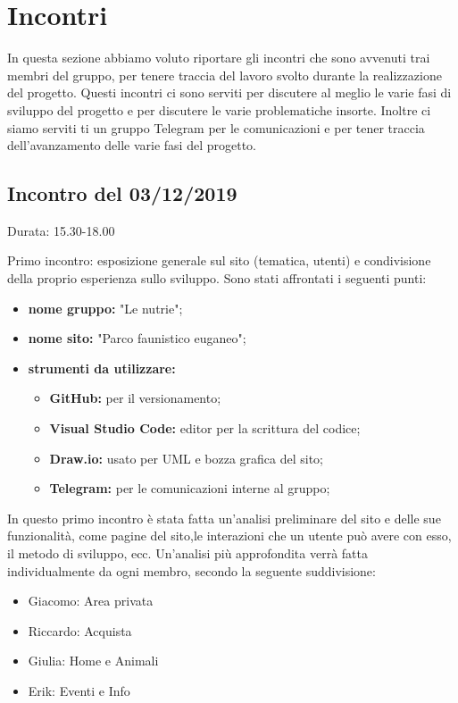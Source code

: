 \section{Incontri}
In questa sezione abbiamo voluto riportare gli incontri che sono avvenuti trai membri del gruppo, per tenere traccia del lavoro svolto durante la realizzazione del progetto. Questi incontri ci sono serviti per discutere al meglio le varie fasi di sviluppo del progetto e per discutere le varie problematiche insorte. Inoltre ci siamo serviti ti un gruppo Telegram per le comunicazioni e per tener traccia dell'avanzamento delle varie fasi del progetto.

\subsection{Incontro del 03/12/2019}
    Durata: 15.30-18.00

    Primo incontro: esposizione generale sul sito (tematica, utenti) e condivisione della proprio esperienza sullo sviluppo.
    Sono stati affrontati i seguenti punti:
    
    \begin{itemize}
        \item \textbf{nome gruppo:} "Le nutrie"; 
        \item \textbf{nome sito:} "Parco faunistico euganeo"; 
        \item \textbf{strumenti da utilizzare:}
            \begin{itemize}
                \item \textbf{GitHub:} per il versionamento; 
                \item \textbf{Visual Studio Code:} editor per la scrittura del codice; 
                \item \textbf{Draw.io:} usato per UML e bozza grafica del sito;
                \item \textbf{Telegram:} per le comunicazioni interne al gruppo;
            \end{itemize}
    \end{itemize}

    In questo primo incontro è stata fatta un'analisi preliminare del sito e delle sue funzionalità, come pagine del sito,le interazioni che un utente può avere con esso, il metodo di sviluppo, ecc.
    Un'analisi più approfondita verrà fatta individualmente da ogni membro, secondo la seguente suddivisione:
    \begin{itemize}
        \item Giacomo: Area privata
        \item Riccardo: Acquista
        \item Giulia: Home e Animali
        \item Erik: Eventi e Info
    \end{itemize}

